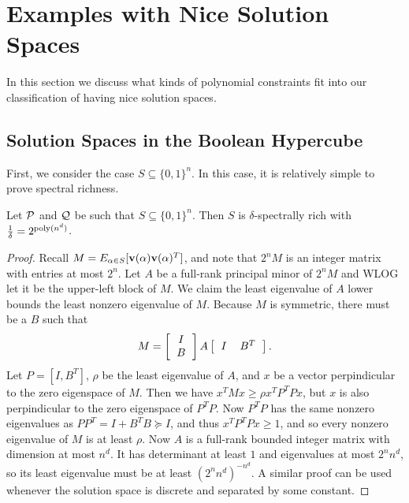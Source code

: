 \section{Examples with Nice Solution Spaces}
\label{sec:nicespaces}
In this section we discuss what kinds of polynomial constraints fit into our classification of having nice solution spaces.
\subsection{Solution Spaces in the Boolean Hypercube}
First, we consider the case $S \subseteq \{0,1\}^n$. In this case, it is relatively simple to prove spectral richness.
\begin{lemma}\label{lem:integer-rich}
Let $\mathcal P$ and $\mathcal Q$ be such that $S \subseteq \{0,1\}^n$. Then $S$ is $\delta$-spectrally rich with $\frac{1}{\delta} = 2^{\operatorname{poly}(n^d)}$.
\end{lemma}
\begin{proof}
Recall $M = E_{\alpha \in S}[{\bf v}(\alpha){\bf v}(\alpha)^T]$, and note that $2^nM$ is an integer matrix with entries at most $2^n$. Let $A$ be a full-rank principal minor of $2^nM$ and WLOG let it be the upper-left block of $M$. We claim the least eigenvalue of $A$ lower bounds the least nonzero eigenvalue of $M$. Because $M$ is symmetric, there must be a $B$ such that
\[M = \left[\begin{tabular}{c} $I$ \\ $B$\end{tabular}\right]A\left[\begin{tabular}{cc} $I$ & $B^T$\end{tabular}\right].\]
Let $P = [I, B^T]$, $\rho$ be the least eigenvalue of $A$, and $x$ be a vector perpindicular to the zero eigenspace of $M$. Then we have $x^TMx \geq \rho x^TP^TPx$,
but $x$ is also perpindicular to the zero eigenspace of $P^TP$. Now $P^TP$ has the same nonzero eigenvalues as $PP^T = I + B^TB \succeq I$, and thus $x^TP^TPx \geq 1$, and so every nonzero eigenvalue of $M$ is at least $\rho$. Now $A$ is a full-rank bounded integer matrix with dimension at most $n^d$. It has determinant at least $1$ and eigenvalues at most $2^nn^d$, so its least eigenvalue must be at least $(2^nn^d)^{-n^d}$. A similar proof can be used whenever the solution space is discrete and separated by some constant. 
\end{proof}

